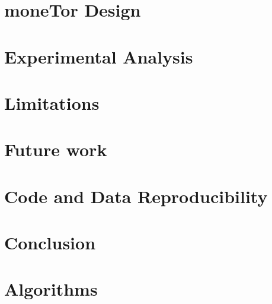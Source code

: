 \documentclass[sigconf, anonymous]{acmart}
\begin{document}
\section{moneTor Design}
\label{sec:design}


\section{Experimental Analysis}
\label{sec:analysis}


\section{Limitations}
\label{sec:limitations}
\section{Future work}
\label{sec:future_work}

\section{Code and Data Reproducibility}
\label{sec:code}

\section{Conclusion}
\label{sec:conclusion}



\appendix

\section{Algorithms}
\label{sec:algorithms}

\end{document}
